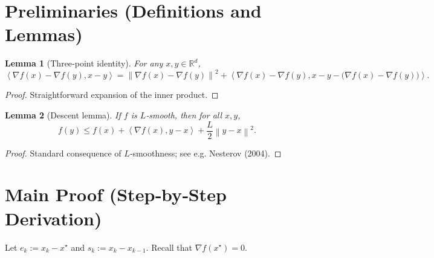 \documentclass{article}
\newtheorem{lemma}{Lemma}
\newcommand{\R}{\mathbb{R}}
\newcommand{\norm}[1]{\left\lVert#1\right\rVert}
\newcommand{\inner}[2]{\left\langle #1,#2\right\rangle}
\begin{document}
\newpage
\section*{Preliminaries (Definitions and Lemmas)}
\begin{lemma}[Three‑point identity]\label{lem:three}
For any $x,y\in\R^{d}$,
\[
\inner{\nabla f(x)-\nabla f(y)}{x-y}
= \norm{\nabla f(x)-\nabla f(y)}^{2}
+\inner{\nabla f(x)-\nabla f(y)}{x-y-\bigl(\nabla f(x)-\nabla f(y)\bigr)} .
\]
\end{lemma}
\begin{proof}
Straightforward expansion of the inner product.
\end{proof}

\begin{lemma}[Descent lemma]\label{lem:descent}
If $f$ is $L$‑smooth, then for all $x,y$,
\[
f(y)\le f(x)+\inner{\nabla f(x)}{y-x}+\frac{L}{2}\norm{y-x}^{2}.
\]
\end{lemma}
\begin{proof}
Standard consequence of $L$‑smoothness; see e.g. Nesterov (2004).
\end{proof}

\section*{Main Proof (Step‑by‑Step Derivation)}
Let $e_k:=x_k-x^{\star}$ and $s_k:=x_k-x_{k-1}$.  
Recall that $\nabla f(x^{\star})=0$.
\end{document}
